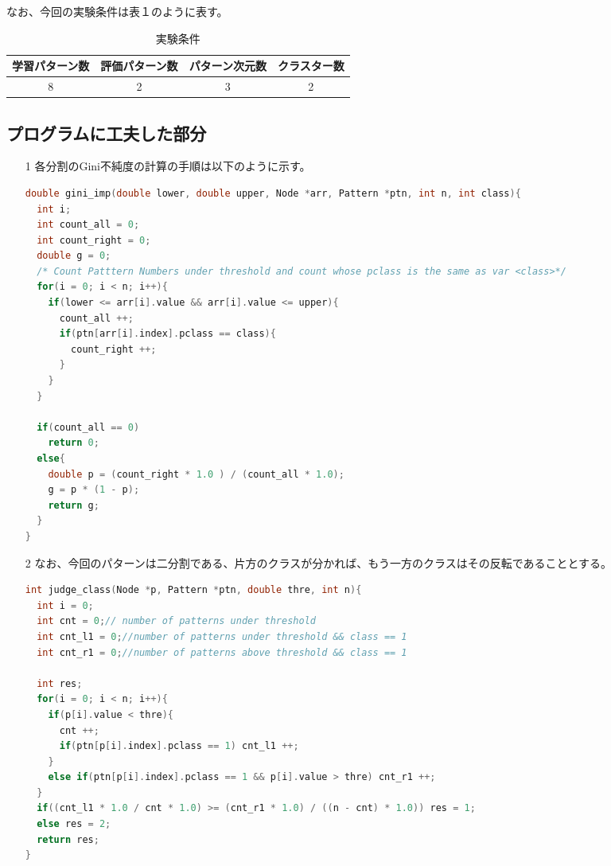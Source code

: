 \documentclass[ %
  uplatex,%
  papersize%
]{jsarticle}
\begin{document}
なお、今回の実験条件は表１のように表す。
\begin{table}[h]\footnotesize
\caption{実験条件}
\label{}
\centering
\begin{tabular}{|c|c|c|c|}
\hline
学習パターン数&評価パターン数&パターン次元数&クラスター数\\
\hline
8&2&3&2\\
\hline
\end{tabular} 
\end{table}

\subsection{プログラムに工夫した部分}
\begin{itemize}
\item[1] 各分割のGini不純度の計算の手順は以下のように示す。

\begin{lstlisting}[language=c,caption=Gini impurity]
  double gini_imp(double lower, double upper, Node *arr, Pattern *ptn, int n, int class){
  int i;
  int count_all = 0;
  int count_right = 0;
  double g = 0;
  /* Count Patttern Numbers under threshold and count whose pclass is the same as var <class>*/
  for(i = 0; i < n; i++){
    if(lower <= arr[i].value && arr[i].value <= upper){
      count_all ++;
      if(ptn[arr[i].index].pclass == class){
        count_right ++;
      }
    }
  }
  
  if(count_all == 0)
    return 0;
  else{
    double p = (count_right * 1.0 ) / (count_all * 1.0);
    g = p * (1 - p);
    return g;
  }
}\end{lstlisting}

\item[2] なお、今回のパターンは二分割である、片方のクラスが分かれば、もう一方のクラスはその反転であることとする。
\begin{lstlisting}[language=c,caption=Judge Class under Threshold]
int judge_class(Node *p, Pattern *ptn, double thre, int n){
  int i = 0;
  int cnt = 0;// number of patterns under threshold
  int cnt_l1 = 0;//number of patterns under threshold && class == 1
  int cnt_r1 = 0;//number of patterns above threshold && class == 1

  int res;
  for(i = 0; i < n; i++){
    if(p[i].value < thre){
      cnt ++;
      if(ptn[p[i].index].pclass == 1) cnt_l1 ++;
    }
    else if(ptn[p[i].index].pclass == 1 && p[i].value > thre) cnt_r1 ++;
  }
  if((cnt_l1 * 1.0 / cnt * 1.0) >= (cnt_r1 * 1.0) / ((n - cnt) * 1.0)) res = 1;
  else res = 2;
  return res;
}\end{lstlisting}
\end{itemize}
\end{document}
